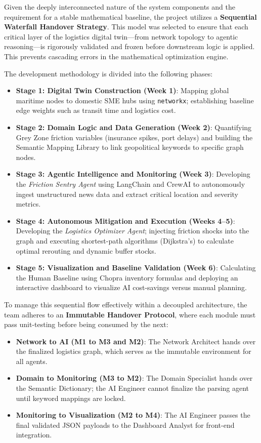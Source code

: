 Given the deeply interconnected nature of the system components and the requirement for a stable mathematical baseline, the project utilizes a \textbf{Sequential Waterfall Handover Strategy}. This model was selected to ensure that each critical layer of the logistics digital twin—from network topology to agentic reasoning—is rigorously validated and frozen before downstream logic is applied. This prevents cascading errors in the mathematical optimization engine.

The development methodology is divided into the following phases:

\begin{itemize}
    \item \textbf{Stage 1: Digital Twin Construction (Week 1)}: Mapping global maritime nodes to domestic SME hubs using \texttt{networkx}; establishing baseline edge weights such as transit time and logistics cost.
    \item \textbf{Stage 2: Domain Logic and Data Generation (Week 2)}: Quantifying Grey Zone friction variables (insurance spikes, port delays) and building the Semantic Mapping Library to link geopolitical keywords to specific graph nodes.
    \item \textbf{Stage 3: Agentic Intelligence and Monitoring (Week 3)}: Developing the \textit{Friction Sentry Agent} using LangChain and CrewAI to autonomously ingest unstructured news data and extract critical location and severity metrics.
    \item \textbf{Stage 4: Autonomous Mitigation and Execution (Weeks 4--5)}: Developing the \textit{Logistics Optimizer Agent}; injecting friction shocks into the graph and executing shortest-path algorithms (Dijkstra's) to calculate optimal rerouting and dynamic buffer stocks.
    \item \textbf{Stage 5: Visualization and Baseline Validation (Week 6)}: Calculating the Human Baseline using Chopra inventory formulas and deploying an interactive dashboard to visualize AI cost-savings versus manual planning.
\end{itemize}

To manage this sequential flow effectively within a decoupled architecture, the team adheres to an \textbf{Immutable Handover Protocol}, where each module must pass unit-testing before being consumed by the next:
\begin{itemize}
    \item \textbf{Network to AI (M1 to M3 and M2)}: The Network Architect hands over the finalized logistics graph, which serves as the immutable environment for all agents.
    \item \textbf{Domain to Monitoring (M3 to M2)}: The Domain Specialist hands over the Semantic Dictionary; the AI Engineer cannot finalize the parsing agent until keyword mappings are locked.
    \item \textbf{Monitoring to Visualization (M2 to M4)}: The AI Engineer passes the final validated JSON payloads to the Dashboard Analyst for front-end integration.
\end{itemize}
